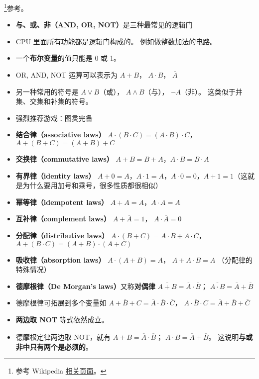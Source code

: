 
\begin{issues}
\issueDraft
\end{issues}

\footnote{参考 Wikipedia \href{https://en.wikipedia.org/wiki/Boolean_algebra}{相关页面}。}参考。

\begin{itemize}
\item \textbf{与、或、非（AND, OR, NOT）}是三种最常见的逻辑门
\item CPU 里面所有功能都是逻辑门构成的。 例如做整数加法的电路。
\item 一个\textbf{布尔变量}的值只能是 0 或 1。
\item OR, AND, NOT 运算可以表示为 $A + B$， $A\cdot B$， $\overline A$
\item 另一种常用的符号是 $A\lor B$（或）， $A\land B$（与）， $\neg A$（非）。 这类似于并集、交集和补集的符号。
\item 强烈推荐游戏：图灵完备
\item \textbf{结合律（associative laws）} $A\cdot(B\cdot C) = (A\cdot B)\cdot C$， $A+(B+C)=(A+B)+C$
\item \textbf{交换律（commutative laws）} $A+B=B+A$，$A\cdot B=B\cdot A$
\item \textbf{有界律（identity laws）} $A+0=A$，$A\cdot 1=A$，$A\cdot 0 = 0$，$A+1=1$（这就是为什么要用加号和乘号，很多性质都很相似）
\item \textbf{幂等律（idempotent laws）} $A+A=A$，$A\cdot A=A$
\item \textbf{互补律（complement laws）} $A+\overline A = 1$， $A\cdot \overline A = 0$
\item \textbf{分配律（distributive laws）} $A\cdot(B+C)=A\cdot B+A\cdot C$， $A+(B\cdot C) = (A+B)\cdot(A+C)$
\item \textbf{吸收律（absorption laws）} $A\cdot(A+B) = A$， $A+A\cdot B = A$ （分配律的特殊情况）
\item \textbf{德摩根律（De Morgan's laws）}又称\textbf{对偶律} $\overline{A+B} = \overline A \cdot \overline B$； $\overline{A \cdot B} = \overline A + \overline B$
\item 德摩根律可拓展到多个变量如 $\overline{A+B+C} = \overline A \cdot \overline B \cdot \overline C$， $\overline{A \cdot B\cdot C} = \overline A + \overline B + \overline C$
\item \textbf{两边取 NOT} 等式依然成立。
\item 德摩根定律两边取 NOT，就有 $A+B = \overline{\overline A \cdot \overline B}$； $A \cdot B = \overline{\overline A + \overline B}$。 这说明\textbf{与或非中只有两个是必须的}。

\end{itemize}
